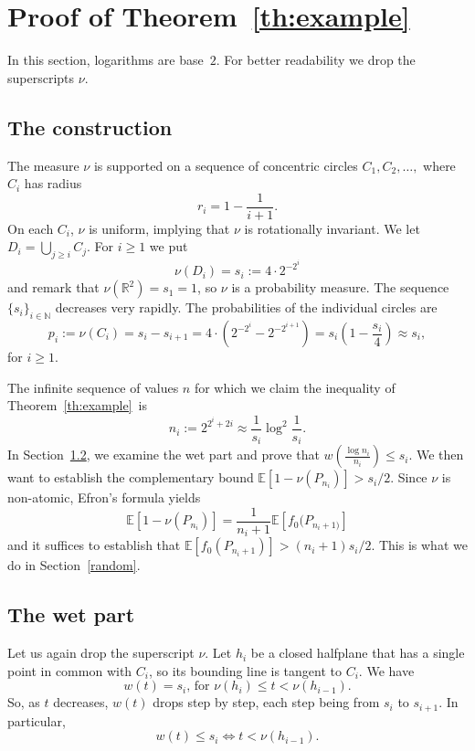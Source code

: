 \documentclass[AHL,Unicode,longabstracts]{cedram}
\newcommand{\wet}[1]{w(#1)}
\newcommand{\Nbb}{\mathbb{N}}%
\newcommand{\Rbb}{\mathbb{R}}%
\newcommand{\Ebb}{\mathbb{E}}%
\newcommand{\pth}[1]{\left(#1 \right)}
\newcommand{\ptb}[1]{\left[#1 \right]}
\newcommand*{\mtfrac}[2]{\frac{#1}{#2}}%
\begin{document}
\section{Proof of Theorem~\ref{th:example}}\label{sec:example}

In this section, logarithms are base~$2$. For better readability we drop the superscripts $\nu$.

\subsection{The construction}

The measure $\nu$ is supported on a sequence of concentric circles $C_1, C_2, \dots,$ where $C_i$ has radius
\[
r_i=1-\frac1{i+1}.
\]
On each $C_i$, $\nu$ is uniform, implying that $\nu$ is rotationally invariant. We let $D_i=\bigcup_{j \ge i} C_j$. For $i \ge 1$ we put
\[
\nu(D_i)= s_i := 4 \cdot 2^{-2^i}
\]
and remark that $\nu(\Rbb^2) = s_1 = 1$, so $\nu$ is a probability measure. The sequence $\{s_i\}_{i \in \Nbb}$ decreases very rapidly. The probabilities of the individual circles are
\[
p_i:=\nu(C_i)=s_i-s_{i+1}=4\cdot\pth{2^{-2^i}-2^{-2^{i+1}}} =s_i\pth{1-\frac{s_i}4}\approx s_i,
\]
for $i\ge1$.

The infinite sequence of values $n$ for which we claim the inequality of Theorem~\ref{th:example}~is
\[
n_i :=2^{2^i+2i} \approx \mtfrac 1{s_i} \log^2 \mtfrac 1{s_i}.
\]
In Section~\ref{wet}, we examine the wet part and prove that $\wet{\mtfrac{\log n_i}{n_i}}\le s_i$. We then want to establish the complementary bound $\Ebb\ptb{1-\nu(P_{n_i})}> s_i/2$. Since $\nu$ is non-atomic, Efron's formula yields
\[
\Ebb\ptb{1-\nu(P_{n_i })} = \frac1{n_i+1} \Ebb\ptb{f_0(P_{n_i+1)}}
\]
and it suffices to establish that $\Ebb\ptb{f_0(P_{n_i+1})} > (n_i+1) s_i/2$. This is what we do in Section~\ref{random}.



\subsection{The wet part}\label{wet}

Let us again drop the superscript $\nu$. Let $h_i$ be a closed halfplane that has a single point in common with $C_i$, so its bounding line is tangent to $C_i$. We have
\[
\wet{t}=s_{i} \text{, \ for } \nu(h_{i}) \le t < \nu(h_{i-1}).
\]
So, as $t$ decreases, $\wet t$ drops step by step, each step being from $s_i$ to $s_{i+1}$. In particular,
\begin{equation}\label{eq:drops-one}
\wet {t}\le s_{i} \iff t< \nu(h_{i-1}).
\end{equation}
\end{document}
